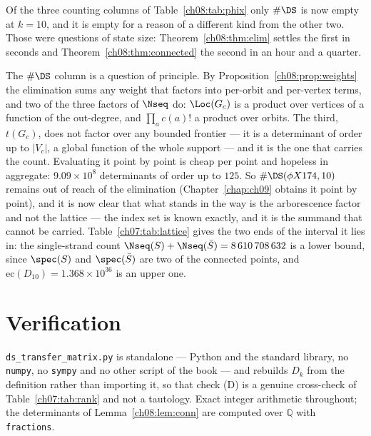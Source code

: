 \begin{remark}\label{ch08:rem:wall}
Of the three counting columns of Table~\ref{ch08:tab:phix} only $\#\DS$ is now empty at $k=10$, and
it is empty for a reason of a different kind from the other two. Those were questions of state
size: Theorem~\ref{ch08:thm:elim} settles the first in seconds and Theorem~\ref{ch08:thm:connected} the
second in an hour and a quarter.

The $\#\DS$ column is a question of principle. By
Proposition~\ref{ch08:prop:weights} the elimination sums any weight that factors into per-orbit and
per-vertex terms, and two of the three factors of $\Nseq$ do: $\Loc(G_c)$ is a product over
vertices of a function of the out-degree, and $\prod_a c(a)!$ a product over orbits. The third,
$t(G_c)$, does not factor over any bounded frontier --- it is a determinant of order up to
$|V_c|$, a global function of the whole support --- and it is the one that carries the count.
Evaluating it point by point is cheap per point and hopeless in aggregate: $9.09\times10^8$
determinants of order up to $125$. So $\#\DS(\phi X174,10)$ remains out of reach of the elimination (Chapter~\ref{chap:ch09} obtains it
point by point), and it is
now clear that what stands in the way is the arborescence factor and not the lattice --- the
index set is known exactly, and it is the summand that cannot be carried. Table~\ref{ch07:tab:lattice}
gives the two ends of the interval it lies in: the single-strand count
$\Nseq(S)+\Nseq(\bar S)=8\,610\,708\,632$ is a lower bound, since $\spec(S)$ and $\spec(\bar S)$
are two of the connected points, and $\mathrm{ec}(D_{10})=1.368\times10^{36}$ is an upper one.
\end{remark}

\section{Verification}\label{ch08:sec:checks}

\texttt{ds\_transfer\_matrix.py} is standalone --- Python and the standard library, no
\texttt{numpy}, no \texttt{sympy} and no other script of the book --- and rebuilds $D_k$ from
the definition rather than importing it, so that check (D) is a genuine cross-check of Table~\ref{ch07:tab:rank} and not a tautology. Exact integer arithmetic throughout; the determinants of
Lemma~\ref{ch08:lem:conn} are computed over $\mathbb Q$ with \texttt{fractions}.

